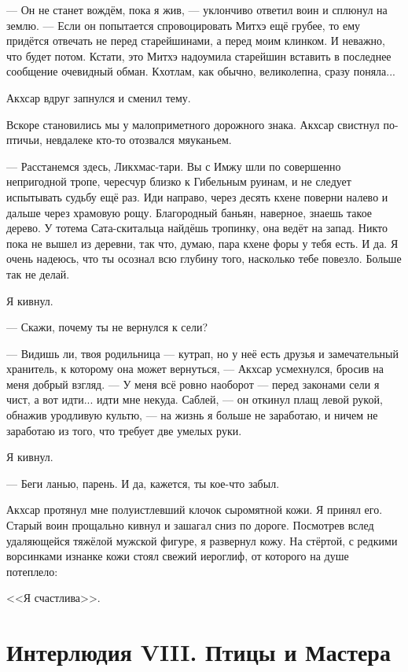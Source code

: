 --- Он не станет вождём, пока я жив, --- уклончиво ответил воин и сплюнул на землю.
--- Если он попытается спровоцировать Митхэ ещё грубее, то ему придётся отвечать не перед старейшинами, а перед моим клинком.
И неважно, что будет потом.
Кстати, это Митхэ надоумила старейшин вставить в последнее сообщение очевидный обман.
Кхотлам, как обычно, великолепна, сразу поняла...

Акхсар вдруг запнулся и сменил тему.

Вскоре становились мы у малоприметного дорожного знака.
Акхсар свистнул по-птичьи, невдалеке кто-то отозвался мяуканьем.

--- Расстанемся здесь, Ликхмас-тари.
Вы с Имжу шли по совершенно непригодной тропе, чересчур близко к Гибельным руинам, и не следует испытывать судьбу ещё раз.
Иди направо, через десять кхене поверни налево и дальше через храмовую рощу.
Благородный баньян, наверное, знаешь такое дерево.
У тотема Сата-скитальца найдёшь тропинку, она ведёт на запад.
Никто пока не вышел из деревни, так что, думаю, пара кхене форы у тебя есть.
И да.
Я очень надеюсь, что ты осознал всю глубину того, насколько тебе повезло.
Больше так не делай.

Я кивнул.

--- Скажи, почему ты не вернулся к сели?

--- Видишь ли, твоя родильница --- кутрап, но у неё есть друзья и замечательный хранитель, к которому она может вернуться, --- Акхсар усмехнулся, бросив на меня добрый взгляд.
--- У меня всё ровно наоборот --- перед законами сели я чист, а вот идти... идти мне некуда.
Саблей, --- он откинул плащ левой рукой, обнажив уродливую культю, --- на жизнь я больше не заработаю, и ничем не заработаю из того, что требует две умелых руки.

Я кивнул.

--- Беги ланью, парень.
И да, кажется, ты кое-что забыл.

Акхсар протянул мне полуистлевший клочок сыромятной кожи.
Я принял его.
Старый воин прощально кивнул и зашагал сниз по дороге.
Посмотрев вслед удаляющейся тяжёлой мужской фигуре, я развернул кожу.
На стёртой, с редкими ворсинками изнанке кожи стоял свежий иероглиф, от которого на душе потеплело:

<<Я счастлива>>.

\chapter*{Интерлюдия VIII. Птицы и Мастера}

